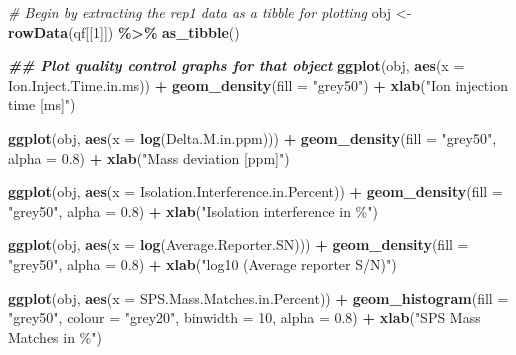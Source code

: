 \documentclass[9pt,a4paper,]{extarticle}
\newenvironment{Shaded}{\begin{snugshade}}{\end{snugshade}}
\newcommand{\AttributeTok}[1]{\textcolor[rgb]{0.13,0.29,0.53}{#1}}
\newcommand{\CommentTok}[1]{\textcolor[rgb]{0.56,0.35,0.01}{\textit{#1}}}
\newcommand{\DecValTok}[1]{\textcolor[rgb]{0.00,0.00,0.81}{#1}}
\newcommand{\DocumentationTok}[1]{\textcolor[rgb]{0.56,0.35,0.01}{\textbf{\textit{#1}}}}
\newcommand{\FloatTok}[1]{\textcolor[rgb]{0.00,0.00,0.81}{#1}}
\newcommand{\FunctionTok}[1]{\textcolor[rgb]{0.13,0.29,0.53}{\textbf{#1}}}
\newcommand{\NormalTok}[1]{#1}
\newcommand{\OtherTok}[1]{\textcolor[rgb]{0.56,0.35,0.01}{#1}}
\newcommand{\SpecialCharTok}[1]{\textcolor[rgb]{0.81,0.36,0.00}{\textbf{#1}}}
\newcommand{\StringTok}[1]{\textcolor[rgb]{0.31,0.60,0.02}{#1}}
\begin{document}
\begin{Shaded}
\begin{Highlighting}[]
\CommentTok{\# Begin by extracting the rep1 data as a tibble for plotting}
\NormalTok{obj }\OtherTok{\textless{}{-}} \FunctionTok{rowData}\NormalTok{(qf[[}\DecValTok{1}\NormalTok{]]) }\SpecialCharTok{\%\textgreater{}\%}
  \FunctionTok{as\_tibble}\NormalTok{()}

\DocumentationTok{\#\# Plot quality control graphs for that object}
\FunctionTok{ggplot}\NormalTok{(obj, }\FunctionTok{aes}\NormalTok{(}\AttributeTok{x =}\NormalTok{ Ion.Inject.Time.in.ms)) }\SpecialCharTok{+}
  \FunctionTok{geom\_density}\NormalTok{(}\AttributeTok{fill =} \StringTok{"grey50"}\NormalTok{) }\SpecialCharTok{+}
  \FunctionTok{xlab}\NormalTok{(}\StringTok{"Ion injection time [ms]"}\NormalTok{)}

\FunctionTok{ggplot}\NormalTok{(obj, }\FunctionTok{aes}\NormalTok{(}\AttributeTok{x =} \FunctionTok{log}\NormalTok{(Delta.M.in.ppm))) }\SpecialCharTok{+}
  \FunctionTok{geom\_density}\NormalTok{(}\AttributeTok{fill =} \StringTok{"grey50"}\NormalTok{, }\AttributeTok{alpha =} \FloatTok{0.8}\NormalTok{) }\SpecialCharTok{+}
  \FunctionTok{xlab}\NormalTok{(}\StringTok{"Mass deviation [ppm]"}\NormalTok{) }

\FunctionTok{ggplot}\NormalTok{(obj, }\FunctionTok{aes}\NormalTok{(}\AttributeTok{x =}\NormalTok{ Isolation.Interference.in.Percent)) }\SpecialCharTok{+}
  \FunctionTok{geom\_density}\NormalTok{(}\AttributeTok{fill =} \StringTok{"grey50"}\NormalTok{, }\AttributeTok{alpha =} \FloatTok{0.8}\NormalTok{) }\SpecialCharTok{+}
  \FunctionTok{xlab}\NormalTok{(}\StringTok{"Isolation interference in \%"}\NormalTok{) }

\FunctionTok{ggplot}\NormalTok{(obj, }\FunctionTok{aes}\NormalTok{(}\AttributeTok{x =} \FunctionTok{log}\NormalTok{(Average.Reporter.SN))) }\SpecialCharTok{+}
  \FunctionTok{geom\_density}\NormalTok{(}\AttributeTok{fill =} \StringTok{"grey50"}\NormalTok{, }\AttributeTok{alpha =} \FloatTok{0.8}\NormalTok{) }\SpecialCharTok{+}
  \FunctionTok{xlab}\NormalTok{(}\StringTok{"log10 (Average reporter S/N)"}\NormalTok{) }

\FunctionTok{ggplot}\NormalTok{(obj, }\FunctionTok{aes}\NormalTok{(}\AttributeTok{x =}\NormalTok{ SPS.Mass.Matches.in.Percent)) }\SpecialCharTok{+}
  \FunctionTok{geom\_histogram}\NormalTok{(}\AttributeTok{fill =} \StringTok{"grey50"}\NormalTok{, }\AttributeTok{colour =} \StringTok{"grey20"}\NormalTok{, }
                 \AttributeTok{binwidth =} \DecValTok{10}\NormalTok{, }\AttributeTok{alpha =} \FloatTok{0.8}\NormalTok{) }\SpecialCharTok{+}
  \FunctionTok{xlab}\NormalTok{(}\StringTok{"SPS Mass Matches in \%"}\NormalTok{) }


\end{Highlighting}
\end{Shaded}
\end{document}
